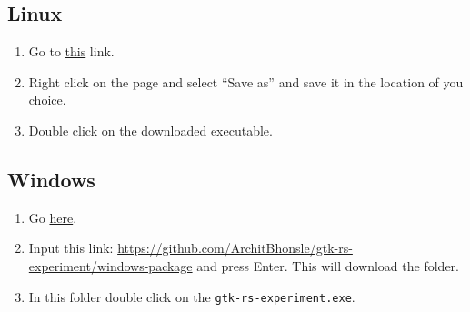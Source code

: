\documentclass[12pt, a4]{article}
\begin{document}
\subsection{Linux}

\begin{enumerate}
  \item{Go to \href{https://github.com/ArchitBhonsle/gtk-rs-experiment/blob/main/linux-executable?raw=true}{this}
        link.}
  \item{Right click on the page and select ``Save as'' and save it in the location of you choice.}
  \item{Double click on the downloaded executable.}
\end{enumerate}

\subsection{Windows}

\begin{enumerate}
  \item{Go \href{https://download-directory.github.io/}{here}.}
  \item{Input this link: \url{https://github.com/ArchitBhonsle/gtk-rs-experiment/windows-package} and press Enter. This will download the folder.}
  \item{In this folder double click on the \texttt{gtk-rs-experiment.exe}.}
\end{enumerate}
\end{document}
